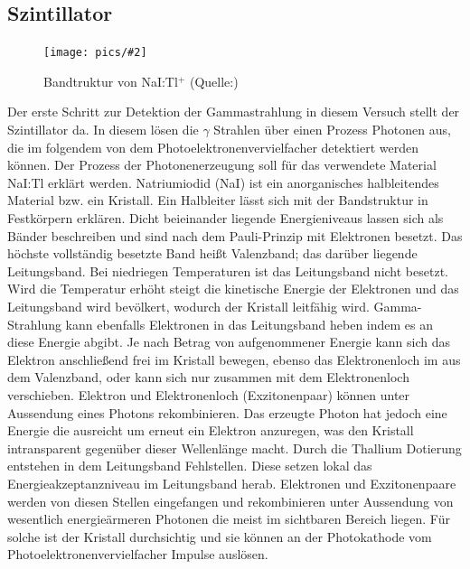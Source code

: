 \documentclass[12pt]{article}
\newcommand{\bild}[3]{\begin{figure}[H] \centering \texttt{[image: pics/\#2]} \caption{#3}	\label{img:#2} \end{figure}}
\begin{document}
\subsection{Szintillator}
\bild{0.6}{sz_halbleiter}{Bandtruktur von NaI:Tl$^+$ (Quelle:\cite{TobijasKotyk.16.11.2005})}
Der erste Schritt zur Detektion der Gammastrahlung in diesem Versuch stellt der Szintillator da. In diesem lösen die $\gamma$ Strahlen über einen Prozess Photonen aus, die im folgendem von dem Photoelektronenvervielfacher detektiert werden können. Der Prozess der Photonenerzeugung soll für das verwendete Material NaI:Tl erklärt werden. Natriumiodid (NaI) ist ein anorganisches halbleitendes Material bzw. ein Kristall. Ein Halbleiter lässt sich mit der Bandstruktur in Festkörpern erklären. Dicht beieinander liegende Energieniveaus lassen sich als Bänder beschreiben und sind nach dem Pauli-Prinzip mit Elektronen besetzt. Das höchste vollständig besetzte Band heißt Valenzband; das darüber liegende Leitungsband. Bei niedriegen Temperaturen ist das Leitungsband nicht besetzt. Wird die Temperatur erhöht steigt die kinetische Energie der Elektronen und das Leitungsband wird bevölkert, wodurch der Kristall leitfähig wird. Gamma-Strahlung kann ebenfalls Elektronen in das Leitungsband heben indem es an diese Energie abgibt. Je nach Betrag von aufgenommener Energie kann sich das Elektron anschließend frei im Kristall bewegen, ebenso das Elektronenloch im aus dem Valenzband, oder kann sich nur zusammen mit dem Elektronenloch verschieben. Elektron und Elektronenloch (Exzitonenpaar) können unter Aussendung eines Photons rekombinieren. Das erzeugte Photon hat jedoch eine Energie die ausreicht um erneut ein Elektron anzuregen, was den Kristall intransparent gegenüber dieser Wellenlänge macht. Durch die Thallium Dotierung entstehen in dem Leitungsband Fehlstellen. Diese setzen lokal das Energieakzeptanzniveau im Leitungsband herab. Elektronen und Exzitonenpaare werden von diesen Stellen eingefangen und rekombinieren unter Aussendung von wesentlich energieärmeren Photonen die meist im sichtbaren Bereich liegen. Für solche ist der Kristall durchsichtig und sie können an der Photokathode vom Photoelektronenvervielfacher Impulse auslösen.
\end{document}
